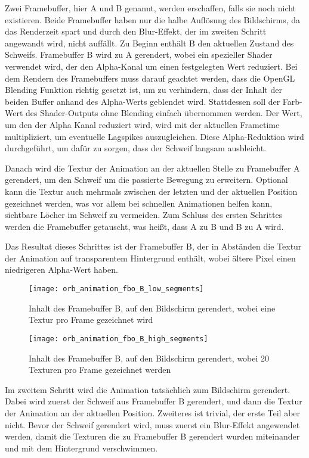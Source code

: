 Zwei Framebuffer, hier A und B genannt, werden erschaffen, falls sie noch nicht existieren.
Beide Framebuffer haben nur die halbe Auflösung des Bildschirms, da das Renderzeit spart und durch den Blur-Effekt, der
im zweiten Schritt angewandt wird, nicht auffällt.
Zu Beginn enthält B den aktuellen Zustand des Schweifs.
Framebuffer B wird zu A gerendert, wobei ein spezieller Shader verwendet wird, der den Alpha-Kanal um einen festgelegten
Wert reduziert.
Bei dem Rendern des Framebuffers muss darauf geachtet werden, dass die OpenGL Blending Funktion richtig gesetzt ist,
um zu verhindern, dass der Inhalt der beiden Buffer anhand des Alpha-Werts geblendet wird.
Stattdessen soll der Farb-Wert des Shader-Outputs ohne Blending einfach übernommen werden.
Der Wert, um den der Alpha Kanal reduziert wird, wird mit der aktuellen Frametime multipliziert, um eventuelle
Lagspikes auszugleichen.
Diese Alpha-Reduktion wird durchgeführt, um dafür zu sorgen, dass der Schweif langsam ausbleicht.

Danach wird die Textur der Animation an der aktuellen Stelle zu Framebuffer A gerendert, um den Schweif um die passierte
Bewegung zu erweitern.
Optional kann die Textur auch mehrmals zwischen der letzten und der aktuellen Position gezeichnet werden, was vor allem
bei schnellen Animationen helfen kann, sichtbare Löcher im Schweif zu vermeiden.
Zum Schluss des ersten Schrittes werden die Framebuffer getauscht, was heißt, dass A zu B und B zu A wird.

Das Resultat dieses Schrittes ist der Framebuffer B, der in Abständen die Textur der Animation auf transparentem
Hintergrund enthält, wobei ältere Pixel einen niedrigeren Alpha-Wert haben.

\begin{figure}[H]
    \centering
    \texttt{[image: orb\_animation\_fbo\_B\_low\_segments]}
    \caption{Inhalt des Framebuffer B, auf den Bildschirm gerendert, wobei eine Textur pro Frame gezeichnet wird }
\end{figure}

\begin{figure}[H]
    \centering
    \texttt{[image: orb\_animation\_fbo\_B\_high\_segments]}
    \caption{Inhalt des Framebuffer B, auf den Bildschirm gerendert, wobei 20 Texturen pro Frame gezeichnet werden }
\end{figure}

Im zweitem Schritt wird die Animation tatsächlich zum Bildschirm gerendert.
Dabei wird zuerst der Schweif aus Framebuffer B gerendert, und dann die Textur der Animation an der aktuellen Position.
Zweiteres ist trivial, der erste Teil aber nicht.
Bevor der Schweif gerendert wird, muss zuerst ein Blur-Effekt angewendet werden, damit die Texturen die zu Framebuffer
B gerendert wurden miteinander und mit dem Hintergrund verschwimmen.

